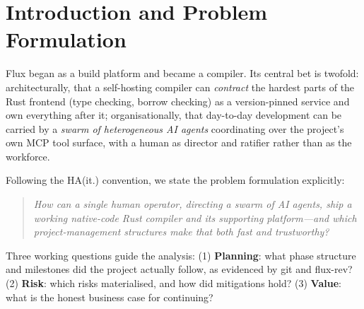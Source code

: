 
\begin{abstract}
\noindent This report analyses the Flux project---a hybrid self-hosting Rust compiler and agent-native build platform---as a \emph{project}, using the project-management toolbox of the Copenhagen Business School HA(it.) tradition: problem formulation, stakeholder analysis, phase/Gantt planning, milestone tracking, risk management, execution analytics, and a business-case discussion. All quantitative material is mined from primary sources: the git history (117 commits, 2026-06-05 to 2026-07-02), the flux-rev content-addressed provenance log, the release tags, and the swarm settlement journal (716 settled agent tasks). The report also carries forward, and strengthens with figures, the strongest sections of the accompanying whitepaper. The project's headline result: six compiler releases in eight days by a coordinated swarm of AI agents, under a governance model where every claim is gated by execution and every release has a recomputable identity.
\end{abstract}

\tableofcontents
\vspace{1em}

\section{Introduction and Problem Formulation}

Flux began as a build platform and became a compiler. Its central bet is twofold: architecturally, that a self-hosting compiler can \emph{contract} the hardest parts of the Rust frontend (type checking, borrow checking) as a version-pinned service and own everything after it; organisationally, that day-to-day development can be carried by a \emph{swarm of heterogeneous AI agents} coordinating over the project's own MCP tool surface, with a human as director and ratifier rather than as the workforce.

Following the HA(it.) convention, we state the problem formulation explicitly:

\begin{quote}
\emph{How can a single human operator, directing a swarm of AI agents, ship a working native-code Rust compiler and its supporting platform---and which project-management structures make that both fast and trustworthy?}
\end{quote}

Three working questions guide the analysis: (1) \textbf{Planning}: what phase structure and milestones did the project actually follow, as evidenced by git and flux-rev? (2) \textbf{Risk}: which risks materialised, and how did mitigations hold? (3) \textbf{Value}: what is the honest business case for continuing?

